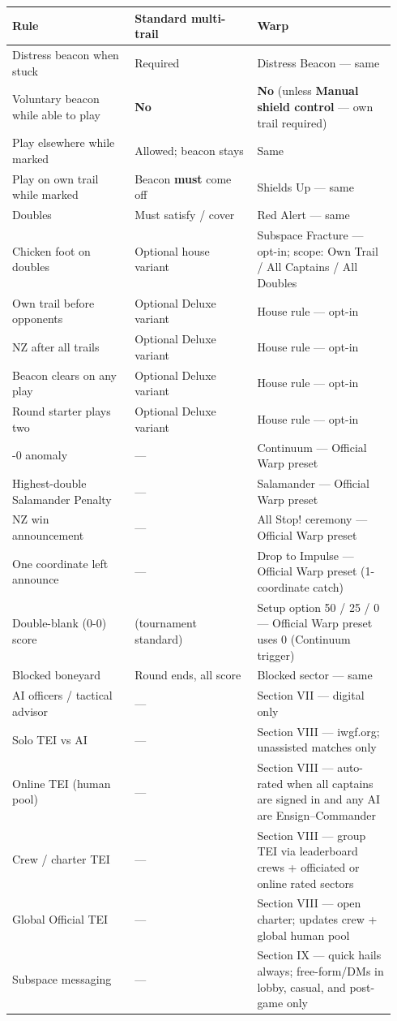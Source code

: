 \documentclass[11pt]{article}
\begin{document}
\begin{longtable}[]{@{}>{\raggedright\arraybackslash}p{0.30\linewidth}>{\raggedright\arraybackslash}p{0.30\linewidth}>{\raggedright\arraybackslash}p{0.34\linewidth}@{}}
\toprule\noalign{}
Rule & Standard multi-trail & Warp \\
\midrule\noalign{}
\endhead
\bottomrule\noalign{}
\endlastfoot
Distress beacon when stuck & Required & Distress Beacon --- same \\
Voluntary beacon while able to play & \textbf{No} & \textbf{No} (unless
\textbf{Manual shield control} --- own trail required) \\
Play elsewhere while marked & Allowed; beacon stays & Same \\
Play on own trail while marked & Beacon \textbf{must} come off & Shields
Up --- same \\
Doubles & Must satisfy / cover & Red Alert --- same \\
Chicken foot on doubles & Optional house variant & Subspace Fracture ---
opt-in; scope: Own Trail / All Captains / All Doubles \\
Own trail before opponents & Optional Deluxe variant & House rule ---
opt-in \\
NZ after all trails & Optional Deluxe variant & House rule --- opt-in \\
Beacon clears on any play & Optional Deluxe variant & House rule ---
opt-in \\
Round starter plays two & Optional Deluxe variant & House rule ---
opt-in \\
0-0 anomaly & --- & Continuum --- Official Warp preset \\
Highest-double Salamander Penalty & --- & Salamander --- Official Warp
preset \\
NZ win announcement & --- & All Stop! ceremony --- Official Warp
preset \\
One coordinate left announce & --- & Drop to Impulse --- Official Warp preset
(1-coordinate catch) \\
Double-blank (0-0) score & 50 (tournament standard) & Setup option 50 /
25 / 0 --- Official Warp preset uses 0 (Continuum trigger) \\
Blocked boneyard & Round ends, all score & Blocked sector --- same \\
AI officers / tactical advisor & --- & Section VII --- digital only \\
Solo TEI vs AI & --- & Section VIII --- iwgf.org; unassisted matches
only \\
Online TEI (human pool) & --- & Section VIII --- auto-rated when all
captains are signed in and any AI are Ensign--Commander \\
Crew / charter TEI & --- & Section VIII --- group TEI via leaderboard
crews + officiated or online rated sectors \\
Global Official TEI & --- & Section VIII --- open charter; updates crew
+ global human pool \\
Subspace messaging & --- & Section IX --- quick hails always;
free-form/DMs in lobby, casual, and post-game only \\
\end{longtable}
\end{document}
